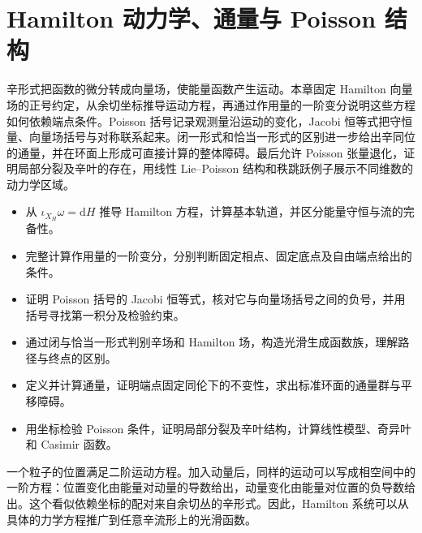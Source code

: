 
% 
% 

\chapter{Hamilton 动力学、通量与 Poisson 结构}
\label{g4:ch:09}

\begin{chapterabstract}
辛形式把函数的微分转成向量场，使能量函数产生运动。本章固定 Hamilton 向量场的正号约定，从余切坐标推导运动方程，再通过作用量的一阶变分说明这些方程如何依赖端点条件。Poisson 括号记录观测量沿运动的变化，Jacobi 恒等式把守恒量、向量场括号与对称联系起来。闭一形式和恰当一形式的区别进一步给出辛同位的通量，并在环面上形成可直接计算的整体障碍。最后允许 Poisson 张量退化，证明局部分裂及辛叶的存在，用线性 Lie--Poisson 结构和秩跳跃例子展示不同维数的动力学区域。
\end{chapterabstract}

\begin{learninggoals}
\begin{itemize}
	\item 从 \(\iota_{X_H}\omega=\mathrm{d}H\) 推导 Hamilton 方程，计算基本轨道，并区分能量守恒与流的完备性。
	\item 完整计算作用量的一阶变分，分别判断固定相点、固定底点及自由端点给出的条件。
	\item 证明 Poisson 括号的 Jacobi 恒等式，核对它与向量场括号之间的负号，并用括号寻找第一积分及检验约束。
	\item 通过闭与恰当一形式判别辛场和 Hamilton 场，构造光滑生成函数族，理解路径与终点的区别。
	\item 定义并计算通量，证明端点固定同伦下的不变性，求出标准环面的通量群与平移障碍。
	\item 用坐标检验 Poisson 条件，证明局部分裂及辛叶结构，计算线性模型、奇异叶和 Casimir 函数。
\end{itemize}
\end{learninggoals}

一个粒子的位置满足二阶运动方程。加入动量后，同样的运动可以写成相空间中的一阶方程：位置变化由能量对动量的导数给出，动量变化由能量对位置的负导数给出。这个看似依赖坐标的配对来自余切丛的辛形式。因此，Hamilton 系统可以从具体的力学方程推广到任意辛流形上的光滑函数。

